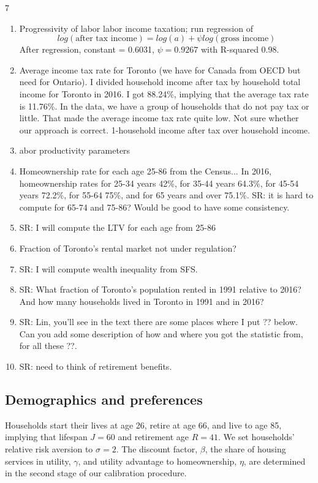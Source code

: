 7\documentclass[parskip=full]{article}
\begin{document}
\begin{enumerate}
    \item Progressivity of labor labor income taxation; run regression of \begin{equation}
        log(\mbox{after tax income})=log(a)+\psi log(\mbox{gross income})
    \end{equation} 
    After regression, constant = 0.6031, $\psi=0.9267$ with R-squared 0.98. 
    \item Average income tax rate for Toronto (we have for Canada from OECD but need for Ontario).
    I divided household income after tax by household total income for Toronto in 2016. I got 88.24\%, implying that the average tax rate is 11.76\%.  In the data, we have a group of households that do not pay tax or little. That made the average income tax rate quite low. Not sure whether our approach is correct. 1-household income after tax over household income. 
    \item abor productivity parameters
    \item Homeownership rate for each age 25-86 from the Census...
    In 2016, homeownership rates for 25-34 years 42\%, for 35-44 years 64.3\%, for 45-54 years 72.2\%, for 55-64 75\%, and for 65 years and over 75.1\%. SR: it is hard to compute for 65-74 and 75-86? Would be good to have some consistency.
    \item SR: I will compute the LTV for each age from 25-86
    \item Fraction of Toronto's rental market not under regulation?
    \item SR: I will compute wealth inequality from SFS.
    \item SR: What fraction of Toronto's population rented in 1991 relative to 2016? And how many households lived in Toronto in 1991 and in 2016? 
    \item SR: Lin, you'll see in the text there are some places where I put ?? below. Can you add some description of how and where you got the statistic from, for all these ??. 
    \item SR: need to think of retirement benefits.
\end{enumerate}

\subsection{Demographics and preferences}
Households start their lives at age 26, retire at age 66, and live to age 85, implying that lifespan $J=60$ and retirement age $R=41$. We set households' relative risk aversion to $\sigma=2$. The discount factor, $\beta$, the share of housing services in utility, $\gamma$, and utility advantage to homeownership, $\eta$, are determined in the second stage of our calibration procedure.
\end{document}
